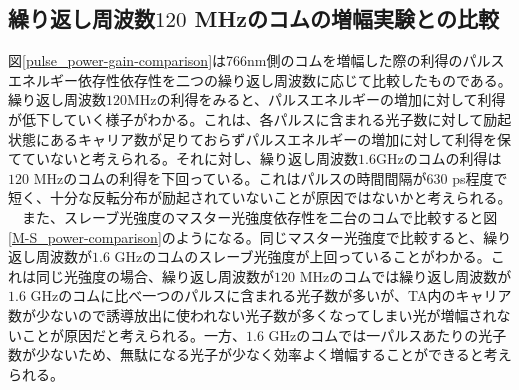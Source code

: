 \documentclass[uplatex, dvipdfmx, a4paper, report, papersize, 11pt]{jsbook}
\begin{document}
\subsection{繰り返し周波数$120$ MHzのコムの増幅実験との比較}
図\ref{pulse_power-gain-comparison}は766nm側のコムを増幅した際の利得のパルスエネルギー依存性依存性を二つの繰り返し周波数に応じて比較したものである。繰り返し周波数$120 \mathrm{MHz}$の利得をみると、パルスエネルギーの増加に対して利得が低下していく様子がわかる。これは、各パルスに含まれる光子数に対して励起状態にあるキャリア数が足りておらずパルスエネルギーの増加に対して利得を保てていないと考えられる。それに対し、繰り返し周波数$1.6 \mathrm{GHz}$のコムの利得は$120$ MHzのコムの利得を下回っている。これはパルスの時間間隔が$630$ ps程度で短く、十分な反転分布が励起されていないことが原因ではないかと考えられる。\\
　また、スレーブ光強度のマスター光強度依存性を二台のコムで比較すると図\ref{M-S_power-comparison}のようになる。同じマスター光強度で比較すると、繰り返し周波数が$1.6$ GHzのコムのスレーブ光強度が上回っていることがわかる。これは同じ光強度の場合、繰り返し周波数が$120$ MHzのコムでは繰り返し周波数が$1.6$ GHzのコムに比べ一つのパルスに含まれる光子数が多いが、TA内のキャリア数が少ないので誘導放出に使われない光子数が多くなってしまい光が増幅されないことが原因だと考えられる。一方、$1.6$ GHzのコムでは一パルスあたりの光子数が少ないため、無駄になる光子が少なく効率よく増幅することができると考えられる。
\end{document}
